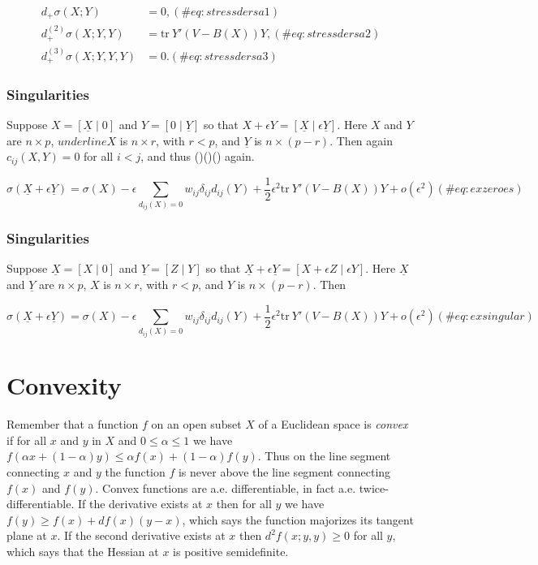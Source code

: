 \documentclass[
  12pt,
  letterpaper,
  DIV=11,
  numbers=noendperiod]{scrreprt}
\theoremstyle{remark}
\begin{document}
\begin{align}
d_+\sigma(X;Y)&=0,(\#eq:stressdersa1)\\
d_+^{(2)}\sigma(X;Y,Y)&=\text{tr}\ Y'(V-B(X))Y,(\#eq:stressdersa2)\\
d_+^{(3)}\sigma(X;Y,Y,Y)&=0.(\#eq:stressdersa3)
\end{align}

\subsubsection{Singularities}\label{singularities}

Suppose \(X=[\underline{X}\mid 0]\) and \(Y=[0\mid\underline{Y}]\) so
that \(X+\epsilon Y=[\underline{X}\mid\epsilon\underline{Y}]\). Here
\(X\) and \(Y\) are \(n\times p\), \(underline{X}\) is \(n\times r\),
with \(r<p\), and \(\underline{Y}\) is \(n\times(p-r)\). Then again
\(c_{ij}(X,Y)=0\) for all \(i<j\), and thus ()()() again.

\begin{equation}
\sigma(\underline{X}+\epsilon
\underline{Y})=\sigma(X)-\epsilon\sum_{d_{ij}(X)=0}w_{ij}\delta_{ij}d_{ij}(Y)
+\frac12\epsilon^2\text{tr}\ Y'(V-B(X))Y+o(\epsilon^2)
(\#eq:exzeroes)
\end{equation}

\subsubsection{Singularities}\label{singularities-1}

Suppose \(\underline{X}=[X\mid 0]\) and \(\underline{Y}=[Z\mid Y]\) so
that
\(\underline{X}+\epsilon\underline{Y}=[X+\epsilon Z\mid\epsilon Y]\).
Here \(\underline{X}\) and \(\underline{Y}\) are \(n\times p\), \(X\) is
\(n\times r\), with \(r<p\), and \(Y\) is \(n\times(p-r)\). Then

\begin{equation}
\sigma(\underline{X}+\epsilon
\underline{Y})=\sigma(X)-\epsilon\sum_{d_{ij}(X)=0}w_{ij}\delta_{ij}d_{ij}(Y)
+\frac12\epsilon^2\text{tr}\ Y'(V-B(X))Y+o(\epsilon^2)
(\#eq:exsingular)
\end{equation}

\section{Convexity}\label{propconvex}

Remember that a function \(f\) on an open subset \(X\) of a Euclidean
space is \emph{convex} if for all \(x\) and \(y\) in \(X\) and
\(0\leq\alpha\leq 1\) we have
\(f(\alpha x+(1-\alpha)y)\leq\alpha f(x)+(1-\alpha)f(y)\). Thus on the
line segment connecting \(x\) and \(y\) the function \(f\) is never
above the line segment connecting \(f(x)\) and \(f(y)\). Convex
functions are a.e. differentiable, in fact a.e. twice-differentiable. If
the derivative exists at \(x\) then for all \(y\) we have
\(f(y)\geq f(x)+df(x)(y-x)\), which says the function majorizes its
tangent plane at \(x\). If the second derivative exists at \(x\) then
\(d^2f(x;y,y)\geq 0\) for all \(y\), which says that the Hessian at
\(x\) is positive semidefinite.
\end{document}
